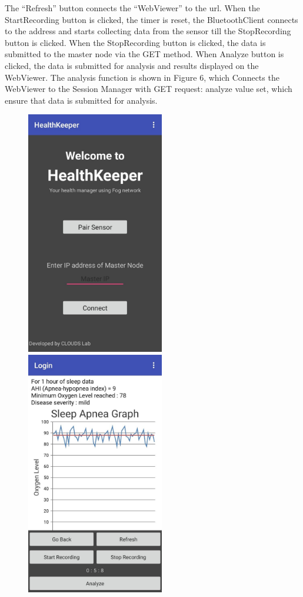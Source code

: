 \documentclass[AMA,STIX1COL]{WileyNJD-v2}
\begin{document}
The “Refresh” button connects the “WebViewer” to the url. When the StartRecording button is clicked, the timer is reset, the BluetoothClient connects to the address and starts collecting data from the sensor till the StopRecording button is clicked. When the StopRecording button is clicked, the data is submitted to the master node via the GET method. When Analyze button is clicked, the data is submitted for analysis and results displayed on the WebViewer. The analysis function is shown in Figure 6, which Connects the WebViewer to the Session Manager with GET request: analyze value set, which ensure that data is submitted for analysis.

\begin{figure}[h]
\centering
\includegraphics[width=6cm]{welcome} \ \ \ \ \ \ \ \ \ \ \       
\includegraphics[width=6cm]{session}
\end{figure}
\end{document}
